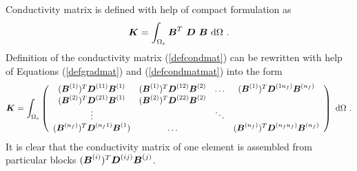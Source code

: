 \documentclass[12pt]{book}
\newcommand{\mbf}[1]{\mbox{\boldmath$#1$}}
\begin{document}
Conductivity matrix is defined with help of compact formulation as
\begin{equation}\label{defcondmat}
\mbf{K} = \int_{\Omega_e} \mbf{B}^T\ \mbf{D}\ \mbf{B}\ {\rm d}\Omega\ .
\end{equation}
Definition of the conductivity matrix (\ref{defcondmat}) can be rewritten with help of
Equations (\ref{defgradmat}) and (\ref{defcondmatmat}) into the form
\begin{equation}
\mbf{K} = \int_{\Omega_e}
\left(\begin{array}{cccc}
(\mbf{B}^{(1)})^T \mbf{D}^{(11)} \mbf{B}^{(1)}     & (\mbf{B}^{(1)})^T \mbf{D}^{(12)} \mbf{B}^{(2)} &
\ldots                                             & (\mbf{B}^{(1)})^T \mbf{D}^{(1n_f)} \mbf{B}^{(n_f)}
\\
(\mbf{B}^{(2)})^T \mbf{D}^{(21)} \mbf{B}^{(1)}     & (\mbf{B}^{(2)})^T \mbf{D}^{(22)} \mbf{B}^{(2)} &
                                                   &
\\
\vdots                                             &                                                &
\ddots                                             &
\\
(\mbf{B}^{(n_f)})^T \mbf{D}^{(n_f1)} \mbf{B}^{(1}) & \ldots                                         &
                                                   & (\mbf{B}^{(n_f)})^T \mbf{D}^{(n_fn_f)} \mbf{B}^{(n_f)}
\\
\end{array}\right)\ {\rm d}\Omega\ .
\end{equation}
It is clear that the conductivity matrix of one element is assembled from particular blocks
$(\mbf{B}^{(i)})^T \mbf{D}^{(ij)} \mbf{B}^{(j)}$.

\end{document}
